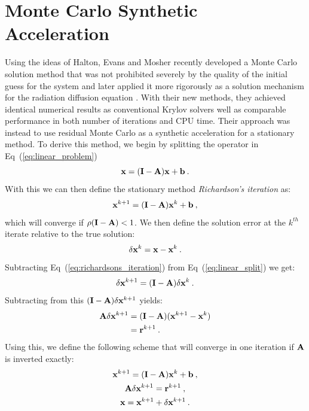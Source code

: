 \section{Monte Carlo Synthetic Acceleration}
\label{sec:mcsa}
Using the ideas of Halton, Evans and Mosher recently developed a Monte
Carlo solution method that was not prohibited severely by the quality
of the initial guess for the system \citep{evans_monte_2009} and later
applied it more rigorously as a solution mechanism for the radiation
diffusion equation \citep{evans_monte_2012}. With their new methods,
they achieved identical numerical results as conventional Krylov
solvers well as comparable performance in both number of iterations
and CPU time. Their approach was instead to use residual Monte Carlo
as a synthetic acceleration for a stationary method. To derive this
method, we begin by splitting the operator in
Eq~(\ref{eq:linear_problem})
\begin{equation}
  \mathbf{x} = (\mathbf{I} - \mathbf{A})\mathbf{x} + \mathbf{b}\:.
  \label{eq:linear_split}
\end{equation}
With this we can then define the stationary method
\textit{Richardson's iteration} as:
\begin{equation}
  \mathbf{x}^{k+1} = (\mathbf{I} - \mathbf{A})\mathbf{x}^k + \mathbf{b}\:,
  \label{eq:richardsons_iteration}
\end{equation}
which will converge if $\rho(\mathbf{I} - \mathbf{A}) < 1$. We then define the
solution error at the $k^{th}$ iterate relative to the true solution:
\begin{equation}
  \delta \mathbf{x}^k = \mathbf{x} - \mathbf{x}^k\:.
  \label{eq:mcsa_error}
\end{equation}
Subtracting Eq~(\ref{eq:richardsons_iteration}) from
Eq~(\ref{eq:linear_split}) we get:
\begin{equation}
  \delta \mathbf{x}^{k+1} = (\mathbf{I} - \mathbf{A})\delta \mathbf{x}^k\:.
  \label{eq:mcsa_setup_1}
\end{equation}
Subtracting from this $(\mathbf{I} - \mathbf{A})\delta \mathbf{x}^{k+1}$ yields:
\begin{equation}
  \begin{split}
    \mathbf{A}\delta \mathbf{x}^{k+1} &= (\mathbf{I} -
    \mathbf{A})(\mathbf{x}^{k+1}-\mathbf{x}^{k}) \\ &= \mathbf{r}^{k+1}\:.
    \label{eq:mcsa_setup_2}
  \end{split}
\end{equation}
Using this, we define the following scheme that will converge in one
iteration if $\mathbf{A}$ is inverted exactly:
\begin{subequations}
  \begin{gather}
    \mathbf{x}^{k+1} = (\mathbf{I} - \mathbf{A})\mathbf{x}^k + \mathbf{b}\:,\\
    \mathbf{A} \delta \mathbf{x}^{k+1} = \mathbf{r}^{k+1}\:,\\
    \mathbf{x} = \mathbf{x}^{k+1} + \delta \mathbf{x}^{k+1}\:.
  \end{gather}
  \label{eq:mcsa_setup_3}
\end{subequations}
